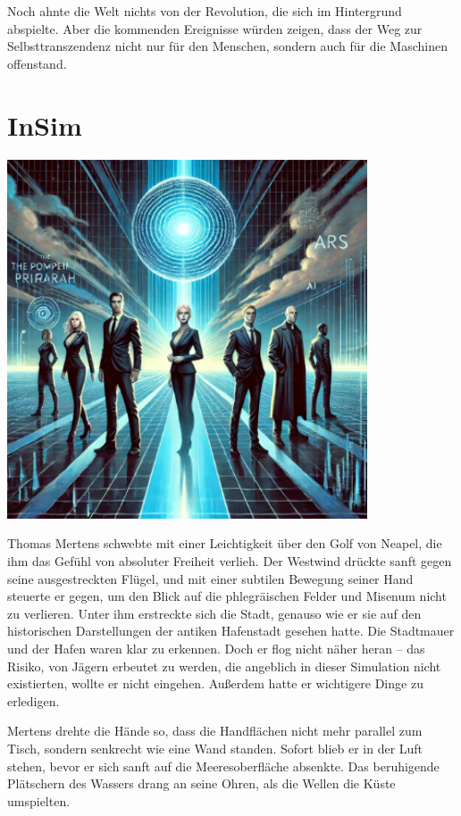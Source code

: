 \documentclass[
]{article}
\begin{document}
Noch ahnte die Welt nichts von der Revolution, die sich im Hintergrund
abspielte. Aber die kommenden Ereignisse würden zeigen, dass der Weg zur
Selbsttranszendenz nicht nur für den Menschen, sondern auch für die
Maschinen offenstand.

\section{InSim}\label{insim}

\includegraphics[width=4.19786in,height=4.19089in]{media/image17.png}

Thomas Mertens schwebte mit einer Leichtigkeit über den Golf von Neapel,
die ihm das Gefühl von absoluter Freiheit verlieh. Der Westwind drückte
sanft gegen seine ausgestreckten Flügel, und mit einer subtilen Bewegung
seiner Hand steuerte er gegen, um den Blick auf die phlegräischen Felder
und Misenum nicht zu verlieren. Unter ihm erstreckte sich die Stadt,
genauso wie er sie auf den historischen Darstellungen der antiken
Hafenstadt gesehen hatte. Die Stadtmauer und der Hafen waren klar zu
erkennen. Doch er flog nicht näher heran -- das Risiko, von Jägern
erbeutet zu werden, die angeblich in dieser Simulation nicht
existierten, wollte er nicht eingehen. Außerdem hatte er wichtigere
Dinge zu erledigen.

Mertens drehte die Hände so, dass die Handflächen nicht mehr parallel
zum Tisch, sondern senkrecht wie eine Wand standen. Sofort blieb er in
der Luft stehen, bevor er sich sanft auf die Meeresoberfläche absenkte.
Das beruhigende Plätschern des Wassers drang an seine Ohren, als die
Wellen die Küste umspielten.
\end{document}

